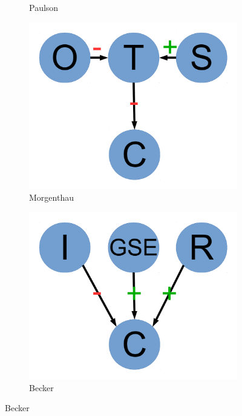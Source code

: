 \documentclass[12pt]{article}
\begin{document}
\begin{figure}
\begin{subfigure}[b]{0.2\textwidth}
                \caption{\footnotesize Paulson}
                \label{fig:paulson}
        \end{subfigure}
        \begin{subfigure}[b]{0.2\textwidth}
                \includegraphics[width=\textwidth]{morgenthau.pdf}
                \caption{\footnotesize Morgenthau}
                \label{fig:morgenthau}
        \end{subfigure}
        \begin{subfigure}[b]{0.2\textwidth}
                \includegraphics[width=\textwidth]{becker.pdf}
                \caption{\footnotesize Becker}

\end{subfigure}
\end{figure}
\end{document}
